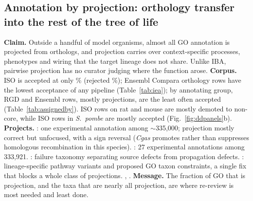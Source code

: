 \subsection{Annotation by projection: orthology transfer into the rest of the tree of life}\label{sec:dd-projection}
\textbf{Claim.} Outside a handful of model organisms, almost all GO annotation is projected from
orthologs, and projection carries over context-specific processes, phenotypes and wiring that the
target lineage does not share. Unlike IBA, pairwise projection has no curator judging where the
function arose.
\textbf{Corpus.} ISO is accepted at only \accISO\% (rejected \rejISO\%); Ensembl Compara orthology
rows have the lowest acceptance of any pipeline (Table~\ref{tab:iea}); by annotating group, RGD and
Ensembl rows, mostly projections, are the least often accepted (Table~\ref{tab:assignedby}).
ISO rows on rat and mouse are mostly demoted to non-core, while ISO rows in \textit{S.\ pombe} are
mostly accepted (Fig.~\ref{fig:ddpanels}b). 
\textbf{Projects.} : one experimental annotation among $\sim$335,000; projection
mostly correct but unfocused, with a sign reversal (\textit{Cgas} promotes rather than suppresses
homologous recombination in this species). : 27 experimental annotations among
333,921. : failure taxonomy separating source defects from propagation defects.
: lineage-specific pathway variants and proposed GO taxon
constraints, a single fix that blocks a whole class of projections.
, .
\textbf{Message.} The fraction of GO that is projection, and the taxa that are nearly all
projection, are where re-review is most needed and least done.
